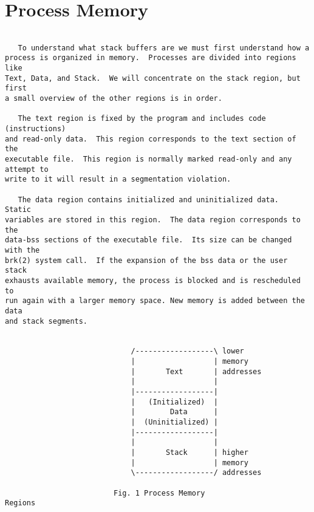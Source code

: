 \section{Process Memory}
\begin{frame}[fragile]
\begin{verbatim}

   To understand what stack buffers are we must first understand how a
process is organized in memory.  Processes are divided into regions like
Text, Data, and Stack.  We will concentrate on the stack region, but first
a small overview of the other regions is in order.

   The text region is fixed by the program and includes code (instructions)
and read-only data.  This region corresponds to the text section of the
executable file.  This region is normally marked read-only and any attempt to
write to it will result in a segmentation violation.

   The data region contains initialized and uninitialized data.  Static
variables are stored in this region.  The data region corresponds to the
data-bss sections of the executable file.  Its size can be changed with the
brk(2) system call.  If the expansion of the bss data or the user stack
exhausts available memory, the process is blocked and is rescheduled to
run again with a larger memory space. New memory is added between the data
and stack segments.


                             /------------------\ lower
                             |                  | memory
                             |       Text       | addresses
                             |                  |
                             |------------------|
                             |   (Initialized)  |
                             |        Data      |
                             |  (Uninitialized) |
                             |------------------|
                             |                  |
                             |       Stack      | higher
                             |                  | memory
                             \------------------/ addresses

                         Fig. 1 Process Memory
Regions

\end{verbatim}
\end{frame}
